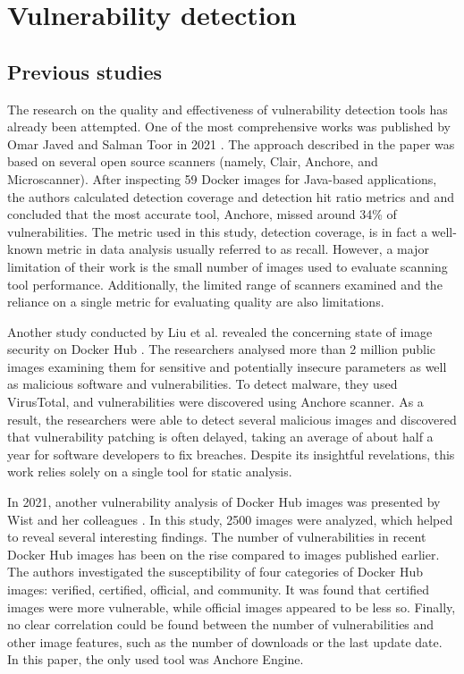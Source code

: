 \section{Vulnerability detection}
\subsection{Previous studies}

The research on the quality and effectiveness of vulnerability detection tools has already been attempted. One of the most comprehensive works was published by Omar Javed and Salman Toor in 2021 \cite{arxiv:1}. The approach described in the paper was based on several open source scanners (namely, Clair, Anchore, and Microscanner). After inspecting 59 Docker images for Java-based applications, the authors calculated detection coverage and detection hit ratio metrics and and concluded that the most accurate tool, Anchore, missed around 34\% of vulnerabilities. The metric used in this study, detection coverage, is in fact a well-known metric in data analysis usually referred to as recall. However, a major limitation of their work is the small number of images used to evaluate scanning tool performance. Additionally, the limited range of scanners examined and the reliance on a single metric for evaluating quality are also limitations.

Another study conducted by Liu et al. revealed the concerning state of image security on Docker Hub \cite{c:16}. The researchers analysed more than 2 million public images examining them for sensitive and potentially insecure parameters as well as malicious software and vulnerabilities. To detect malware, they used VirusTotal, and vulnerabilities were discovered using Anchore scanner. As a result, the researchers were able to detect several malicious images and discovered that vulnerability patching is often delayed, taking an average of about half a year for software developers to fix breaches. Despite its insightful revelations, this work relies solely on a single tool for static analysis.

In 2021, another vulnerability analysis of Docker Hub images was presented by Wist and her colleagues \cite{c:17}. In this study, 2500 images were analyzed, which helped to reveal several interesting findings. The number of vulnerabilities in recent Docker Hub images has been on the rise compared to images published earlier. The authors investigated the susceptibility of four categories of Docker Hub images: verified, certified, official, and community. It was found that certified images were more vulnerable, while official images appeared to be less so. Finally, no clear correlation could be found between the number of vulnerabilities and other image features, such as the number of downloads or the last update date. In this paper, the only used tool was Anchore Engine.

